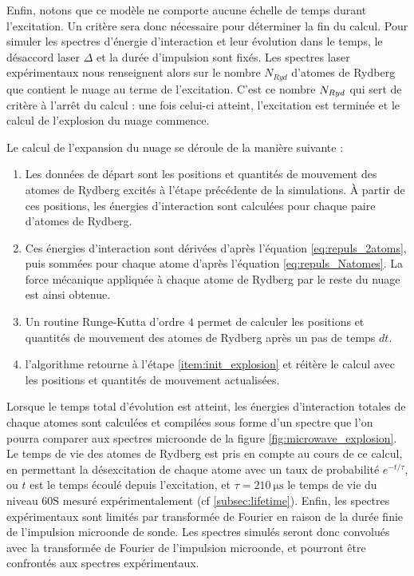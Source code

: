 Enfin, notons que ce modèle ne comporte aucune échelle de temps durant l'excitation.
Un critère sera donc nécessaire pour déterminer la fin du calcul.
Pour simuler les spectres d'énergie d'interaction et leur évolution dans le temps, le désaccord laser $\Delta$ et la durée d'impulsion sont fixés.
Les spectres laser expérimentaux nous renseignent alors sur le nombre $N_{Ryd}$ d'atomes de Rydberg que contient le nuage au terme de l'excitation.
C'est ce nombre $N_{Ryd}$ qui sert de critère à l'arrêt du calcul : une fois celui-ci atteint, l'excitation est terminée et le calcul de l'explosion du nuage commence.

Le calcul de l'expansion du nuage se déroule de la manière suivante :
\begin{enumerate}
\item \label{item:init_explosion}Les données de départ sont les positions et quantités de mouvement des atomes de Rydberg excités à l'étape précédente de la simulations.
\`A partir de ces positions, les énergies d'interaction sont calculées pour chaque paire d'atomes de Rydberg.
\item Ces énergies d'interaction sont dérivées d'après l'équation \eqref{eq:repuls_2atoms}, puis sommées pour chaque atome d'après l'équation \eqref{eq:repuls_Natomes}.
La force mécanique appliquée à chaque atome de Rydberg par le reste du nuage est ainsi obtenue.
\item Un routine Runge-Kutta d'ordre $4$ permet de calculer les positions et quantités de mouvement des atomes de Rydberg après un pas de temps $dt$.
\item l'algorithme retourne à l'étape \ref{item:init_explosion} et réitère le calcul avec les positions et quantités de mouvement actualisées.
\end{enumerate}
Lorsque le temps total d'évolution est atteint, les énergies d'interaction totales de chaque atomes sont calculées et compilées sous forme d'un spectre que l'on pourra comparer aux spectres microonde de la figure \eqref{fig:microwave_explosion}.
Le temps de vie des atomes de Rydberg est pris en compte au cours de ce calcul, en permettant la désexcitation de chaque atome avec un taux de probabilité $e^{-t/\tau}$, ou $t$ est le temps écoulé depuis l'excitation, et $\tau = \SI{210}{\us}$ le temps de vie du niveau $\mathrm{60S}$ mesuré expérimentalement (cf \ref{subsec:lifetime}).
Enfin, les spectres expérimentaux sont limités par transformée de Fourier en raison de la durée finie de l'impulsion microonde de sonde.
Les spectres simulés seront donc convolués avec la transformée de Fourier de l'impulsion microonde, et pourront être confrontés aux spectres expérimentaux.


